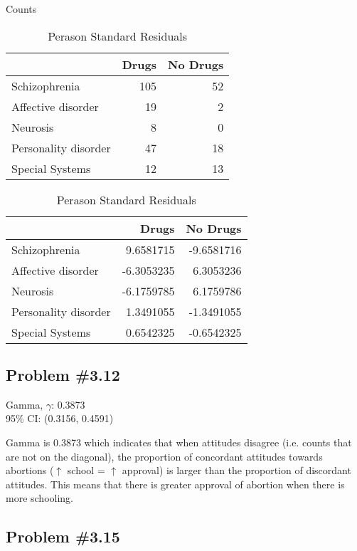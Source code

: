 \documentclass[12pt, letterpaper]{article}
\begin{document}
\begin{table}[!htb]
	\begin{minipage}{.5\linewidth}
		\caption{Counts}
		\centering 
		\begin{tabular}{lrr}
			\toprule
			& Drugs & No Drugs\\
			\midrule
			Schizophrenia & 105 & 52\\
			Affective disorder & 19 & 2\\
			Neurosis & 8 & 0\\
			Personality disorder & 47 & 18\\
			Special Systems & 12 & 13\\
			\bottomrule
	\end{tabular} \end{minipage}%
	\begin{minipage}{.5\linewidth}
		\centering
		\caption{Perason Standard Residuals} 
		\begin{tabular}{lrr}
			\toprule
			& Drugs & No Drugs\\
			\midrule
			Schizophrenia & 9.6581715 & -9.6581716\\
			Affective disorder & -6.3053235 & 6.3053236\\
			Neurosis & -6.1759785 & 6.1759786\\
			Personality disorder & 1.3491055 & -1.3491055\\
			Special Systems & 0.6542325 & -0.6542325\\
			\bottomrule
	\end{tabular} \end{minipage} 
\end{table}



\subsection*{Problem {\#}3.12}
Gamma, $\gamma$: 0.3873 \\
95\% CI: (0.3156, 0.4591)

Gamma is 0.3873 which indicates that when attitudes disagree (i.e. counts that are not on the diagonal), the proportion of concordant attitudes towards abortions ($\uparrow$ school = $\uparrow$ approval) is larger than the proportion of discordant attitudes.  This means that there is greater approval of abortion when there is more schooling.  

\subsection*{Problem {\#}3.15}
\end{document}
